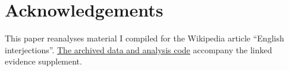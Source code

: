 \documentclass[12pt]{article}
\newif\ifblind
\begin{document}
\ifblind\else
\section*{Acknowledgements}

This paper reanalyses material I compiled for the Wikipedia article
\enquote{English interjections}.
\href{https://github.com/BrettRey/interjections-hpc/tree/master}{The archived
data and analysis code} accompany the linked evidence supplement.
\fi

\clearpage
\begingroup
\setlength{\emergencystretch}{3em}
\printbibliography
\endgroup
\end{document}
